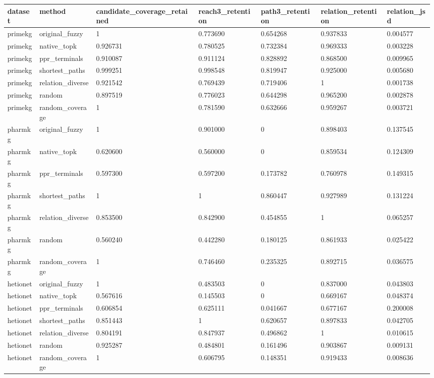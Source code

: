 \begin{tabular}{lllllll}
\hline
dataset & method & candidate\_coverage\_retained & reach3\_retention & path3\_retention & relation\_retention & relation\_jsd \\
\hline
primekg & original\_fuzzy & 1 & 0.773690 & 0.654268 & 0.937833 & 0.004577 \\
primekg & native\_topk & 0.926731 & 0.780525 & 0.732384 & 0.969333 & 0.003228 \\
primekg & ppr\_terminals & 0.910087 & 0.911124 & 0.828892 & 0.868500 & 0.009965 \\
primekg & shortest\_paths & 0.999251 & 0.998548 & 0.819947 & 0.925000 & 0.005680 \\
primekg & relation\_diverse & 0.921542 & 0.769439 & 0.719406 & 1 & 0.001738 \\
primekg & random & 0.897519 & 0.776023 & 0.644298 & 0.965200 & 0.002878 \\
primekg & random\_coverage & 1 & 0.781590 & 0.632666 & 0.959267 & 0.003721 \\
pharmkg & original\_fuzzy & 1 & 0.901000 & 0 & 0.898403 & 0.137545 \\
pharmkg & native\_topk & 0.620600 & 0.560000 & 0 & 0.859534 & 0.124309 \\
pharmkg & ppr\_terminals & 0.597300 & 0.597200 & 0.173782 & 0.760978 & 0.149315 \\
pharmkg & shortest\_paths & 1 & 1 & 0.860447 & 0.927989 & 0.131224 \\
pharmkg & relation\_diverse & 0.853500 & 0.842900 & 0.454855 & 1 & 0.065257 \\
pharmkg & random & 0.560240 & 0.442280 & 0.180125 & 0.861933 & 0.025422 \\
pharmkg & random\_coverage & 1 & 0.746460 & 0.235325 & 0.892715 & 0.036575 \\
hetionet & original\_fuzzy & 1 & 0.483503 & 0 & 0.837000 & 0.043803 \\
hetionet & native\_topk & 0.567616 & 0.145503 & 0 & 0.669167 & 0.048374 \\
hetionet & ppr\_terminals & 0.606854 & 0.625111 & 0.041667 & 0.677167 & 0.200008 \\
hetionet & shortest\_paths & 0.851443 & 1 & 0.620657 & 0.897833 & 0.042705 \\
hetionet & relation\_diverse & 0.804191 & 0.847937 & 0.496862 & 1 & 0.010615 \\
hetionet & random & 0.925287 & 0.484801 & 0.161496 & 0.903867 & 0.009131 \\
hetionet & random\_coverage & 1 & 0.606795 & 0.148351 & 0.919433 & 0.008636 \\

\end{tabular}
